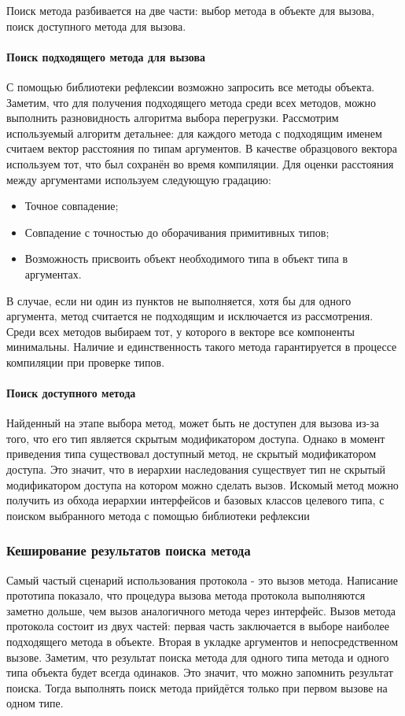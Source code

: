 Поиск метода разбивается на две части: выбор метода в объекте для вызова, поиск доступного метода для вызова.

\paragraph{Поиск подходящего метода для вызова}
С помощью библиотеки рефлексии возможно запросить все методы объекта. Заметим, что для получения подходящего метода среди всех методов, можно выполнить разновидность алгоритма выбора перегрузки. Рассмотрим используемый алгоритм детальнее: для каждого метода с подходящим именем считаем вектор расстояния по типам аргументов. В качестве образцового вектора используем тот, что был сохранён во время компиляции. Для оценки расстояния между аргументами используем следующую градацию:

\begin{itemize}
    \item Точное совпадение;
    \item Совпадение с точностью до оборачивания примитивных типов;
    \item Возможность присвоить объект необходимого типа в объект типа в аргументах.
\end{itemize}

В случае, если ни один из пунктов не выполняется, хотя бы для одного аргумента, метод считается не подходящим и исключается из рассмотрения. Среди всех методов выбираем тот, у которого в векторе все компоненты минимальны. Наличие и единственность такого метода гарантируется в процессе компиляции при проверке типов.

\paragraph{Поиск доступного метода}
Найденный на этапе выбора метод, может быть не доступен для вызова из-за того, что его тип является скрытым модификатором доступа. Однако в момент приведения типа существовал доступный метод, не скрытый модификатором доступа. Это значит, что в иерархии наследования существует тип не скрытый модификатором доступа на котором можно сделать вызов. Искомый метод можно получить из обхода иерархии интерфейсов и базовых классов целевого типа, с поиском выбранного метода с помощью библиотеки рефлексии

\subsubsection{Кеширование результатов поиска метода}
Самый частый сценарий использования протокола - это вызов метода. Написание прототипа показало, что процедура вызова метода протокола выполняются заметно дольше, чем вызов аналогичного метода через интерфейс. Вызов метода протокола состоит из двух частей: первая часть заключается в выборе наиболее подходящего метода в объекте. Вторая в укладке аргументов и непосредственном вызове. Заметим, что результат поиска метода для одного типа метода и одного типа объекта будет всегда одинаков. Это значит, что можно запомнить результат поиска. Тогда выполнять поиск метода прийдётся только при первом вызове на одном типе.

